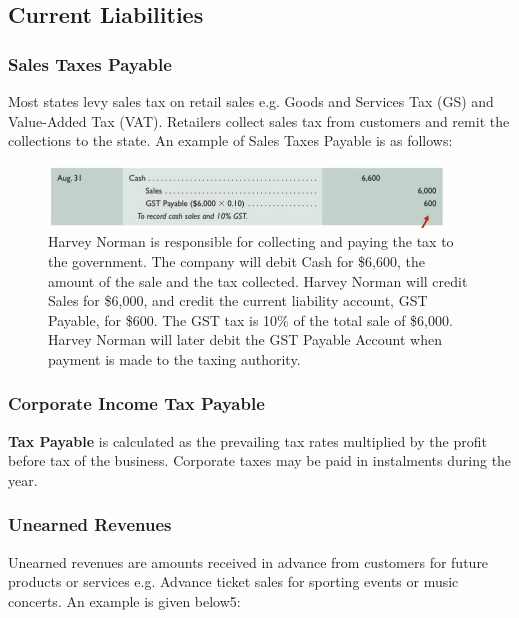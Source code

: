 \documentclass[../main.tex]{subfiles}
\begin{document}
	\subsection{Current Liabilities} 
	\subsubsection{Sales Taxes Payable}
	
	Most states levy sales tax on retail sales e.g. Goods and Services Tax (GS) 
	and Value-Added Tax (VAT). Retailers collect sales tax from customers and 
	remit the collections to the state. An example of Sales Taxes Payable is as 
	follows: 
	
	\begin{figure}[ht]
		\centering
		\includegraphics[width=1\columnwidth]{images/c10_sales_tax_payable.png}
		\caption{Harvey Norman is responsible for collecting 
			and paying the tax to the government. The company will debit Cash 
			for 
			\$6,600, the amount of the sale and the tax collected. Harvey 
			Norman 
			will credit Sales for \$6,000, and credit the current liability 
			account, GST Payable, for \$600. The GST tax is 10\% of the total 
			sale 
			of \$6,000. Harvey Norman will later debit the GST Payable Account 
			when 
			payment is made to the taxing authority.}	
	\end{figure}
	
	\subsubsection{Corporate Income Tax Payable}
	
	\textbf{Tax Payable} is calculated as the prevailing tax rates multiplied 
	by the profit before tax of the business. Corporate taxes may be paid in 
	instalments during the year. 
	
	\subsubsection{Unearned Revenues}
	
	Unearned revenues are amounts received in advance from customers for future 
	products or services e.g. Advance ticket sales for sporting events or music 
	concerts. An example is given below5: 
	
\end{document}
